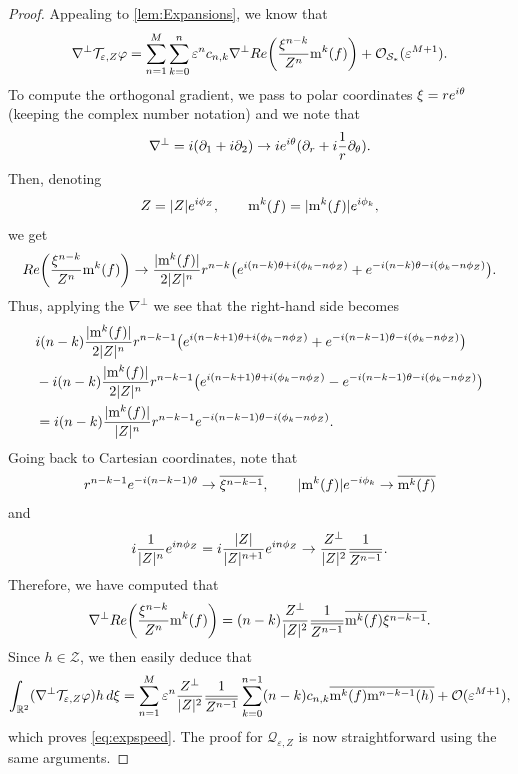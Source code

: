 \documentclass[10pt,a4paper]{amsart}
\def\RR {\mathbb{R}}
\def\Re{{\rm Re}}
\newcommand{\cO}{\mathcal{O}}
\newcommand{\cQ}{\mathcal{Q}}
\newcommand{\cS}{\mathcal{S}}
\newcommand{\cT}{\mathcal{T}}
\newcommand{\cZ}{\mathcal{Z}}
\def\dd{{\rm d}}
\def\de{{\partial}}
\def\e{{\rm e}}
\def\eps{\varepsilon}
\newcommand{\mrm}{\mathrm{m}}
\begin{document}
\begin{proof}
  Appealing to \cref{lem:Expansions}, we know that 
    \begin{align}
\nabla^\perp\cT_{\eps,Z}\varphi=\sum_{n=1}^M\sum_{k=0}^n\eps^nc_{n,k}\nabla^\perp\Re\bigg(\frac{\xi^{n-k}}{Z^n}\mrm^k(f)\bigg)+\cO_{\cS_*}(\eps^{M+1}).
    \end{align}
    To compute the orthogonal gradient, we pass to polar coordinates $\xi=r\e^{i\theta}$ (keeping the complex number notation) and we note that
    \begin{equation}
        \nabla^\perp =i(\de_1+i\de_2)\to i\e^{i\theta}(\de_r+i\frac{1}{r}\de_\theta).
    \end{equation}
    Then, denoting 
    \begin{align}
        Z=|Z|\e^{i\phi_Z}, \qquad \mrm^k(f)=|\mrm^k(f)|\e^{i\phi_k},
    \end{align}
we get    \begin{align}
    \Re\bigg(\frac{\xi^{n-k}}{Z^n}\mrm^k(f)\bigg)\to \frac{|\mrm^k(f)|}{2|Z|^n}r^{n-k}\big(\e^{i(n-k)\theta +i(\phi_k-n\phi_Z)}+\e^{-i(n-k)\theta -i(\phi_k-n\phi_Z)}\big).
    \end{align}
    Thus, applying the $\nabla^\perp$ we see that the right-hand side becomes 
    \begin{align}
    &i(n-k)\frac{|\mrm^k(f)|}{2|Z|^n}r^{n-k-1}\big(\e^{i(n-k+1)\theta +i(\phi_k-n\phi_Z)}+\e^{-i(n-k-1)\theta -i(\phi_k-n\phi_Z)}\big)\\
    &-i(n-k)\frac{|\mrm^k(f)|}{2|Z|^n}r^{n-k-1}\big(\e^{i(n-k+1)\theta +i(\phi_k-n\phi_Z)}-\e^{-i(n-k-1)\theta -i(\phi_k-n\phi_Z)}\big)\\
    &=i(n-k)\frac{|\mrm^k(f)|}{|Z|^n}r^{n-k-1}\e^{-i(n-k-1)\theta -i(\phi_k-n\phi_Z)}.
    \end{align}
    Going back to Cartesian coordinates, note that
    \begin{align}
        r^{n-k-1}\e^{-i(n-k-1)\theta}\to \overline{\xi^{n-k-1}}, \qquad |\mrm^k(f)|\e^{-i\phi_k}\to \overline{\mrm^{k}(f)}
    \end{align}
    and
    \begin{align}
        i\frac{1}{|Z|^n}\e^{in\phi_Z}=i\frac{|Z|}{|Z|^{n+1}}\e^{in\phi_Z}\to \frac{Z^\perp}{|Z|^{2}}\frac{1}{\overline{Z^{n-1}}}.
    \end{align}
    Therefore, we have computed that 
    \begin{align}
\nabla^\perp\Re\bigg(\frac{\xi^{n-k}}{Z^n}\mrm^k(f)\bigg)=(n-k)\frac{Z^\perp}{|Z|^{2}}\frac{1}{\overline{Z^{n-1}}}\overline{\mrm^{k}(f)}\overline{\xi^{n-k-1}}.
    \end{align}
    Since $h\in \cZ$, we then easily deduce that 
    \begin{align}
        \int_{\RR^2}(\nabla^\perp\cT_{\eps,Z}\varphi)h\, \dd\xi=\sum_{n=1}^M\eps^n\frac{Z^\perp}{|Z|^{2}}\frac{1}{\overline{Z^{n-1}}}\sum_{k=0}^{n-1}(n-k)c_{n,k}\overline{\mrm^k(f)}\overline{\mrm^{n-k-1}(h)}+\cO(\eps^{M+1}),
    \end{align}
    which proves \cref{eq:expspeed}.
    The proof for $\cQ_{\eps,Z}$ is now straightforward using the same arguments.
\end{proof}
\end{document}
